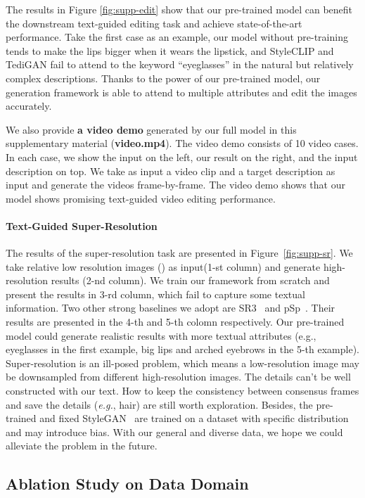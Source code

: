 The results in Figure \ref{fig:supp-edit} show that our pre-trained model can benefit the downstream text-guided editing task and achieve state-of-the-art performance. Take the first case as an example, our model without pre-training tends to make the lips bigger when it wears the lipstick, and StyleCLIP and TediGAN fail to attend to the keyword ``eyeglasses'' in the natural but relatively complex descriptions. Thanks to the power of our pre-trained model, our generation framework is able to attend to multiple attributes and edit the images accurately. 

We also provide \textbf{a video demo} generated by our full model in this supplementary material (\textbf{video.mp4}). The video demo consists of 10 video cases. In each case, we show the input on the left, our result on the right, and the input description on top. We take as input a video clip and a target description as input and generate the videos frame-by-frame. The video demo shows that our model shows promising text-guided video editing performance.

\paragraph{Text-Guided Super-Resolution}
The results of the super-resolution task are presented in Figure~\ref{fig:supp-sr}. We take relative low resolution images () as input(1-st column) and generate high-resolution results (2-nd column). We train our framework from scratch and present the results in 3-rd column, which fail to capture some textual information. Two other strong baselines we adopt are SR3~\cite{saharia2021sr3} and pSp~\cite{richardson2021psp}. Their results are presented in the 4-th and 5-th colomn respectively. Our pre-trained model could generate realistic results with more textual attributes (e.g., eyeglasses in the first example, big lips and arched eyebrows in the 5-th example).  
Super-resolution is an ill-posed problem, which means a low-resolution image may be downsampled from different high-resolution images. The details can't be well constructed with our text. How to keep the consistency between consensus frames and save the details (\textit{e.g.}, hair) are still worth exploration. Besides, the pre-trained and fixed StyleGAN~\cite{karras2019stylegan} are trained on a dataset with specific distribution and may introduce bias. With our general and diverse data, we hope we could alleviate the problem in the future.

\subsection{Ablation Study on Data Domain}

